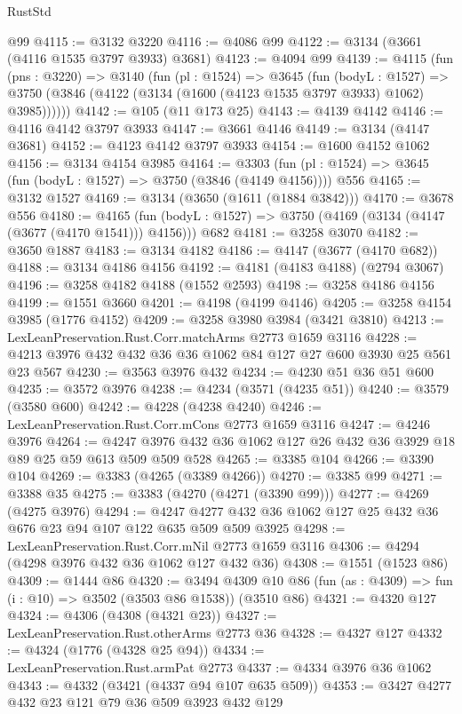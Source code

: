 \begin{lexlean}{RustStd}
\begin{coremodule}
    @99
@4115 := @3132 @3220
@4116 := @4086 @99
@4122 := @3134 (@3661 (@4116 @1535 @3797 @3933) @3681)
@4123 := @4094 @99
@4139 := @4115
    (fun (pns : @3220) =>
    @3140
      (fun (pl : @1524) =>
      @3645
        (fun (bodyL : @1527) =>
        @3750 (@3846 (@4122 (@3134 (@1600 (@4123 @1535 @3797 @3933) @1062) @3985))))))
@4142 := @105 (@11 @173 @25)
@4143 := @4139 @4142
@4146 := @4116 @4142 @3797 @3933
@4147 := @3661 @4146
@4149 := @3134 (@4147 @3681)
@4152 := @4123 @4142 @3797 @3933
@4154 := @1600 @4152 @1062
@4156 := @3134 @4154 @3985
@4164 := @3303 (fun (pl : @1524) => @3645 (fun (bodyL : @1527) => @3750 (@3846 (@4149 @4156)))) @556
@4165 := @3132 @1527
@4169 := @3134 (@3650 (@1611 (@1884 @3842)))
@4170 := @3678 @556
@4180 := @4165
    (fun (bodyL : @1527) => @3750 (@4169 (@3134 (@4147 (@3677 (@4170 @1541))) @4156)))
    @682
@4181 := @3258 @3070
@4182 := @3650 @1887
@4183 := @3134 @4182
@4186 := @4147 (@3677 (@4170 @682))
@4188 := @3134 @4186 @4156
@4192 := @4181 (@4183 @4188) (@2794 @3067)
@4196 := @3258 @4182 @4188 (@1552 @2593)
@4198 := @3258 @4186 @4156
@4199 := @1551 @3660
@4201 := @4198 (@4199 @4146)
@4205 := @3258 @4154 @3985 (@1776 @4152)
@4209 := @3258 @3980 @3984 (@3421 @3810)
@4213 := LexLeanPreservation.Rust.Corr.matchArms @2773 @1659 @3116
@4228 := @4213 @3976 @432 @432 @36 @36 @1062 @84 @127 @27 @600 @3930 @25 @561 @23 @567
@4230 := @3563 @3976 @432
@4234 := @4230 @51 @36 @51 @600
@4235 := @3572 @3976
@4238 := @4234 (@3571 (@4235 @51))
@4240 := @3579 (@3580 @600)
@4242 := @4228 (@4238 @4240)
@4246 := LexLeanPreservation.Rust.Corr.mCons @2773 @1659 @3116
@4247 := @4246 @3976
@4264 := @4247 @3976 @432 @36 @1062 @127 @26 @432 @36 @3929 @18 @89 @25 @59 @613 @509 @509 @528
@4265 := @3385 @104
@4266 := @3390 @104
@4269 := @3383 (@4265 (@3389 @4266))
@4270 := @3385 @99
@4271 := @3388 @35
@4275 := @3383 (@4270 (@4271 (@3390 @99)))
@4277 := @4269 (@4275 @3976)
@4294 := @4247 @4277 @432 @36 @1062 @127 @25 @432 @36 @676 @23 @94 @107 @122 @635 @509 @509 @3925
@4298 := LexLeanPreservation.Rust.Corr.mNil @2773 @1659 @3116
@4306 := @4294 (@4298 @3976 @432 @36 @1062 @127 @432 @36)
@4308 := @1551 (@1523 @86)
@4309 := @1444 @86
@4320 := @3494
    @4309
    @10
    @86
    (fun (as : @4309) => fun (i : @10) => @3502 (@3503 @86 @1538))
    (@3510 @86)
@4321 := @4320 @127
@4324 := @4306 (@4308 (@4321 @23))
@4327 := LexLeanPreservation.Rust.otherArms @2773 @36
@4328 := @4327 @127
@4332 := @4324 (@1776 (@4328 @25 @94))
@4334 := LexLeanPreservation.Rust.armPat @2773
@4337 := @4334 @3976 @36 @1062
@4343 := @4332 (@3421 (@4337 @94 @107 @635 @509))
@4353 := @3427 @4277 @432 @23 @121 @79 @36 @509 @3923 @432 @129

\end{coremodule}
\end{lexlean}
